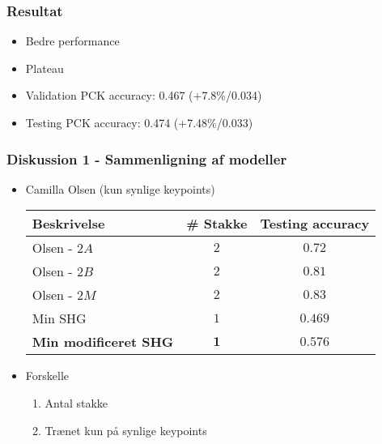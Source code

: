 \documentclass{beamer}
\begin{document}
\begin{frame}
    \frametitle{Resultat}
    \begin{itemize}
        \item<1-> Bedre performance
        \item<2-> Plateau 
        \item<3-> Validation PCK accuracy: 0.467 (+7.8\%/0.034)
        \item<3-> Testing PCK accuracy: 0.474 (+7.48\%/0.033)
    \end{itemize}
\end{frame}

\begin{frame}
    \frametitle{Diskussion 1 - Sammenligning af modeller}
    \begin{itemize}
        \item<1-2> Camilla Olsen (kun synlige keypoints)
        \begin{tabular}{l|c|c}
            Beskrivelse & \# Stakke & Testing accuracy \\
            \hline
            Olsen - $2A$ & $2$ & $0.72$ \\
            \hline
            Olsen - $2B$ & $2$ & $0.81$ \\
            \hline
            Olsen - $2M$ & $2$ & $0.83$ \\
            \hline
            \hline
            Min SHG & $1$ & $0.469$ \\
            \hline
            \textbf{Min modificeret SHG} & $\bm{1}$ & $\bm{0.576}$ \\
            \hline
        \end{tabular}
        \item<2> Forskelle
        \begin{enumerate}
            \item Antal stakke
            \item Trænet kun på synlige keypoints
        \end{enumerate}
    \end{itemize}
\end{frame}
\end{document}
